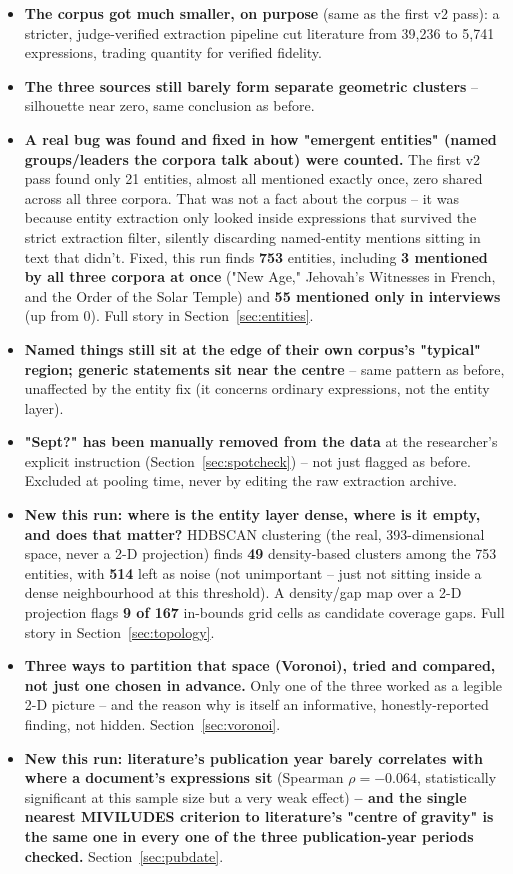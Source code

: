 \documentclass[11pt,a4paper]{article}
\begin{document}
\begin{itemize}[leftmargin=1.4em]
  \item \textbf{The corpus got much smaller, on purpose} (same as the
  first v2 pass): a stricter, judge-verified extraction pipeline cut
  literature from 39,236 to 5,741 expressions, trading quantity for
  verified fidelity.
  \item \textbf{The three sources still barely form separate geometric
  clusters} -- silhouette near zero, same conclusion as before.
  \item \textbf{A real bug was found and fixed in how "emergent
  entities" (named groups/leaders the corpora talk about) were counted.}
  The first v2 pass found only 21 entities, almost all mentioned exactly
  once, zero shared across all three corpora. That was not a fact about
  the corpus -- it was because entity extraction only looked inside
  expressions that survived the strict extraction filter, silently
  discarding named-entity mentions sitting in text that didn't. Fixed,
  this run finds \textbf{753} entities, including \textbf{3 mentioned by
  all three corpora at once} ("New Age," Jehovah's Witnesses in French,
  and the Order of the Solar Temple) and \textbf{55 mentioned only in
  interviews} (up from 0). Full story in Section~\ref{sec:entities}.
  \item \textbf{Named things still sit at the edge of their own corpus's
  "typical" region; generic statements sit near the centre} -- same
  pattern as before, unaffected by the entity fix (it concerns ordinary
  expressions, not the entity layer).
  \item \textbf{"Sept?" has been manually removed from the data} at the
  researcher's explicit instruction (Section~\ref{sec:spotcheck}) -- not
  just flagged as before. Excluded at pooling time, never by editing the
  raw extraction archive.
  \item \textbf{New this run: where is the entity layer dense, where is
  it empty, and does that matter?} HDBSCAN clustering (the real,
  393-dimensional space, never a 2-D projection) finds \textbf{49}
  density-based clusters among the 753 entities, with \textbf{514} left
  as noise (not unimportant -- just not sitting inside a dense
  neighbourhood at this threshold). A density/gap map over a 2-D
  projection flags \textbf{9 of 167} in-bounds grid cells as candidate
  coverage gaps. Full story in Section~\ref{sec:topology}.
  \item \textbf{Three ways to partition that space (Voronoi), tried and
  compared, not just one chosen in advance.} Only one of the three
  worked as a legible 2-D picture -- and the reason why is itself an
  informative, honestly-reported finding, not hidden. Section~\ref{sec:voronoi}.
  \item \textbf{New this run: literature's publication year barely
  correlates with where a document's expressions sit} (Spearman
  $\rho=-0.064$, statistically significant at this sample size but a
  very weak effect) \textbf{-- and the single nearest MIVILUDES criterion
  to literature's "centre of gravity" is the same one in every one of the
  three publication-year periods checked.} Section~\ref{sec:pubdate}.
\end{itemize}
\end{document}
